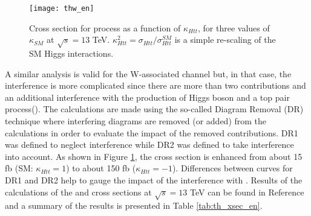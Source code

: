 \begin{figure}[h!]
\centering
\texttt{[image: thw\_en]}
\caption[Cross section for \tHW process as a function of $\kappa_{Htt}$]{Cross section for \tHW process as a function of $\kappa_{Htt}$, for three values of $\kappa_{SM}$ at $\sqrt{s}=13$ TeV. $\kappa_{Htt}^2=\sigma_{Htt}/\sigma_{Htt}^{SM}$ is a simple re-scaling of the SM Higgs interactions.} 
\label{thw_en}
\end{figure}

A similar analysis is valid for the W-associated channel but, in that case, the interference is more complicated since there are more than two contributions and an additional interference with the production of Higgs boson and a top pair process(\ttH). The calculations are made using the so-called Diagram Removal (DR) technique where interfering diagrams are removed (or added) from the calculations in order to evaluate the impact of the removed contributions. DR1 was defined to neglect \ttH interference while DR2 was defined to take \ttH interference into account\cite{demartin}. As shown in Figure \ref{thw_en}, the \tHW cross section is enhanced from about 15 fb (SM: $\kappa_{Htt}=1$) to about 150 fb ($\kappa_{Htt}=-1$). Differences between curves for DR1 and DR2 help to gauge the impact of the interference with \ttH.     
Results of the calculations of the \tHq and \tHW cross sections at $\sqrt{s}=13$ TeV can be found in Reference \cite{yellow} and a summary of the results is presented in Table \ref{tab:th_xsec_en}.

